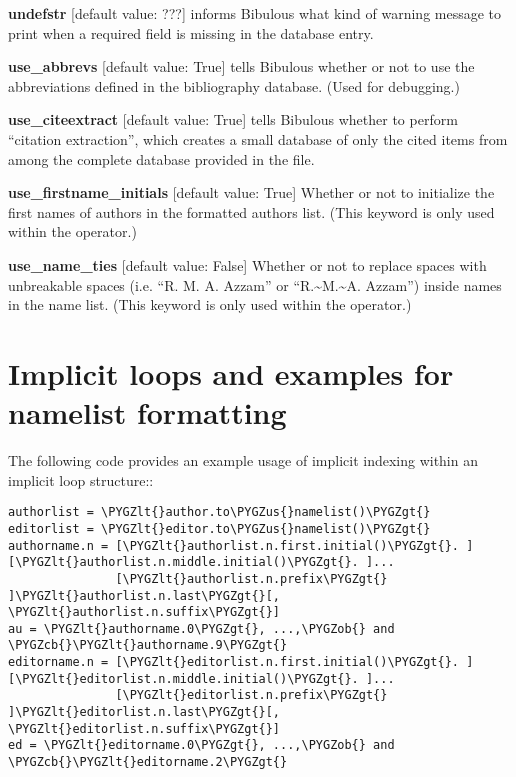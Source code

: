 \documentclass[letterpaper,10pt,english]{sphinxmanual}
\def\PYGZus{\char`\_}
\def\PYGZob{\char`\{}
\def\PYGZcb{\char`\}}
\def\PYGZlt{\char`\<}
\def\PYGZgt{\char`\>}
\begin{document}
\textbf{undefstr} {[}default value: ???{]} informs Bibulous what kind of warning message to print when a required field is missing in the database entry.

\textbf{use\_abbrevs} {[}default value: True{]} tells Bibulous whether or not to use the abbreviations defined in the bibliography database. (Used for debugging.)

\textbf{use\_citeextract} {[}default value: True{]} tells Bibulous whether to perform ``citation extraction'', which creates a small database of only the cited items from among the complete database provided in the  file.

\textbf{use\_firstname\_initials} {[}default value: True{]} Whether or not to initialize the first names of authors in the formatted authors list. (This keyword is only used within the  operator.)

\textbf{use\_name\_ties} {[}default value: False{]} Whether or not to replace spaces with unbreakable spaces (i.e. ``R. M. A. Azzam'' or ``R.\textasciitilde{}M.\textasciitilde{}A. Azzam'') inside names in the name list. (This keyword is only used within the  operator.)


\section{Implicit loops and examples for namelist formatting}
\label{guidelines_for_writing_style_templates:implicit-loops-and-examples-for-namelist-formatting}
The following code provides an example usage of implicit indexing within an implicit loop structure::

\begin{Verbatim}[commandchars=\\\{\}]
authorlist = \PYGZlt{}author.to\PYGZus{}namelist()\PYGZgt{}
editorlist = \PYGZlt{}editor.to\PYGZus{}namelist()\PYGZgt{}
authorname.n = [\PYGZlt{}authorlist.n.first.initial()\PYGZgt{}. ][\PYGZlt{}authorlist.n.middle.initial()\PYGZgt{}. ]...
               [\PYGZlt{}authorlist.n.prefix\PYGZgt{} ]\PYGZlt{}authorlist.n.last\PYGZgt{}[, \PYGZlt{}authorlist.n.suffix\PYGZgt{}]
au = \PYGZlt{}authorname.0\PYGZgt{}, ...,\PYGZob{} and \PYGZcb{}\PYGZlt{}authorname.9\PYGZgt{}
editorname.n = [\PYGZlt{}editorlist.n.first.initial()\PYGZgt{}. ][\PYGZlt{}editorlist.n.middle.initial()\PYGZgt{}. ]...
               [\PYGZlt{}editorlist.n.prefix\PYGZgt{} ]\PYGZlt{}editorlist.n.last\PYGZgt{}[, \PYGZlt{}editorlist.n.suffix\PYGZgt{}]
ed = \PYGZlt{}editorname.0\PYGZgt{}, ...,\PYGZob{} and \PYGZcb{}\PYGZlt{}editorname.2\PYGZgt{}
\end{Verbatim}
\end{document}
